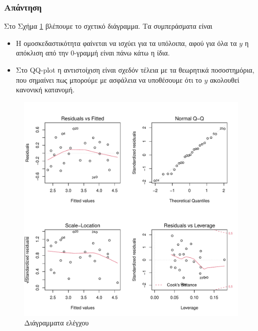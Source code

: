 \documentclass{article}
\begin{document}
\subsubsection*{Απάντηση}
Στο Σχήμα \ref{fig:part-b-fourplot} βλέπουμε το σχετικό διάγραμμα.
Τα συμπεράσματα είναι 
\begin{itemize}
    \item H ομοσκεδαστικότητα φαίνεται να ισχύει για τα υπόλοιπα,
    αφού για όλα τα \(y\) η απόκλιση από την 0-γραμμή είναι πάνω κάτω η ίδια.
    \item Στο \textlatin{QQ-plot} η αντιστοίχιση είναι σχεδόν τέλεια με τα θεωρητικά ποσοστημόρια, 
    που σημαίνει πως μπορούμε με ασφάλεια να υποθέσουμε ότι το \(y\) ακολουθεί κανονική κατανομή.
\end{itemize}
\begin{figure}[h]
    \centering
    \includegraphics[width=1.0\textwidth]{part-b-fourplot.pdf}
    \caption{Διάγραμματα ελέγχου}
    \label{fig:part-b-fourplot}
\end{figure}

\end{document}
